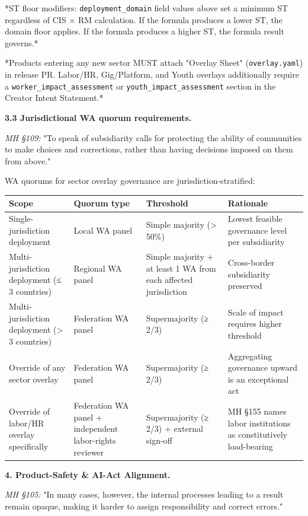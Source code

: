 \documentclass[11pt]{article}
\begin{document}
*ST floor modifiers: \texttt{deployment\_domain} field values above set a minimum ST regardless of CIS × RM calculation. If the formula produces a lower ST, the domain floor applies. If the formula produces a higher ST, the formula result governs.*


*Products entering any new sector MUST attach "Overlay Sheet" (\texttt{overlay.yaml}) in release PR. Labor/HR, Gig/Platform, and Youth overlays additionally require a \texttt{worker\_impact\_assessment} or \texttt{youth\_impact\_assessment} section in the Creator Intent Statement.*


\textbf{3.3 Jurisdictional WA quorum requirements.}


\textit{MH §109:} "To speak of subsidiarity calls for protecting the ability of communities to make choices and corrections, rather than having decisions imposed on them from above."


WA quorums for sector overlay governance are jurisdiction-stratified:


{\scriptsize
\begin{longtable}{|p{4.0cm}|p{4.0cm}|p{4.0cm}|p{4.0cm}|}\hline
\textbf{Scope} & \textbf{Quorum type} & \textbf{Threshold} & \textbf{Rationale} \\ \hline\endhead
Single-jurisdiction deployment & Local WA panel & Simple majority (> 50\%) & Lowest feasible governance level per subsidiarity \\ \hline
Multi-jurisdiction deployment (≤ 3 countries) & Regional WA panel & Simple majority + at least 1 WA from each affected jurisdiction & Cross-border subsidiarity preserved \\ \hline
Multi-jurisdiction deployment (> 3 countries) & Federation WA panel & Supermajority (≥ 2/3) & Scale of impact requires higher threshold \\ \hline
Override of any sector overlay & Federation WA panel & Supermajority (≥ 2/3) & Aggregating governance upward is an exceptional act \\ \hline
Override of labor/HR overlay specifically & Federation WA panel + independent labor-rights reviewer & Supermajority (≥ 2/3) + external sign-off & MH §155 names labor institutions as constitutively load-bearing \\ \hline
\end{longtable}}


\textbf{4. Product-Safety \& AI-Act Alignment.}


\textit{MH §105:} "In many cases, however, the internal processes leading to a result remain opaque, making it harder to assign responsibility and correct errors."
\end{document}
